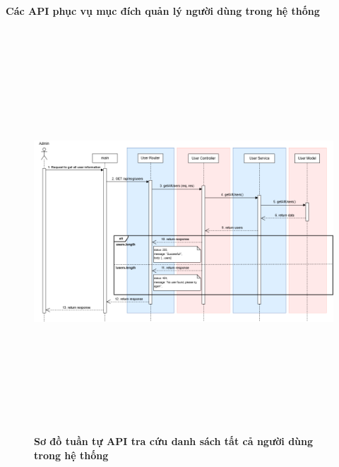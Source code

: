 \paragraph{Các API phục vụ mục đích quản lý người dùng trong hệ thống}
\mbox{}
\begin{figure}[H]
	\centering
	\includegraphics[width=15cm,height=15cm]{Images/api_sequence/user/getAllUsers.drawio.png}
	\caption[Sơ đồ tuần tự API tra cứu danh sách tất cả người dùng trong hệ thống]{\bfseries \fontsize{12pt}{0pt}\selectfont Sơ đồ tuần tự API tra cứu danh sách tất cả người dùng trong hệ thống}
	\label{sequence_diagram_get_all_users}
\end{figure}

